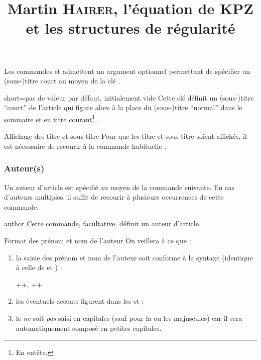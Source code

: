 Les commandes  et  admettent un argument
optionnel permettant de spécifier un (sous-)titre court au moyen de la clé
.

\begin{docKey}{short}{=}{pas de valeur par défaut,
    initialement vide}
  Cette clé définit un (sous-)titre \enquote{court} de l'article qui figure
  alors à la place du (sous-)titre \enquote{normal} dans le sommaire et en titre
  courant\footnote{En entête.}.
\end{docKey}

\begin{bodycode}
\title[short=Les travaux de Martin \textsc{Hairer}]{Martin \textsc{Hairer},
  l'équation de KPZ et les structures de régularité}
\end{bodycode}

\begin{dbremark}{Affichage des titre et sous-titre}{}
  Pour que les titre et sous-titre soient affichés, il est nécessaire de
  recourir à la commande habituelle .
\end{dbremark}

\subsubsection{Auteur(s)}
\label{sec-auteurs}

Un auteur d'article est spécifié au moyen de la commande 
suivante. En cas d'auteurs multiples, il  suffit de recourir à plusieurs
occurrences de cette commande.

\begin{docCommand}{author}{}
  Cette commande, facultative, définit un auteur d'article.
\end{docCommand}
%
\begin{dbwarning}{Format des prénom et nom de l'auteur}{}
  On veillera à ce que :
  \begin{enumerate}
  \item la saisie des prénom et nom de l'auteur soit conforme à la syntaxe
    (identique à celle de  et ) :
\begin{bodycode}[listing options={showspaces}]
++, ++
\end{bodycode}
  \item les éventuels accents figurent dans les  et
     ;
  \item le  \emph{ne} soit \emph{pas} saisi en capitales
    (sauf pour la ou les majuscules) car il sera automatiquement
    composé en petites capitales.
  \end{enumerate}
\end{dbwarning}

